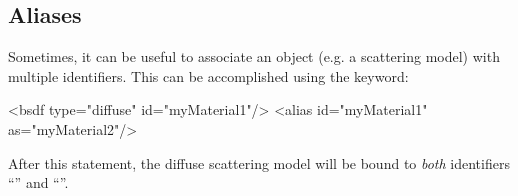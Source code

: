 \subsection{Aliases}
Sometimes, it can be useful to associate an object (e.g. a scattering model)
with multiple identifiers. This can be accomplished using the  keyword:
\begin{xml}
	<bsdf type="diffuse" id="myMaterial1"/>
	<alias id="myMaterial1" as="myMaterial2"/>
\end{xml}
After this statement, the diffuse scattering model will be bound to
\emph{both} identifiers ``'' and ``''.
